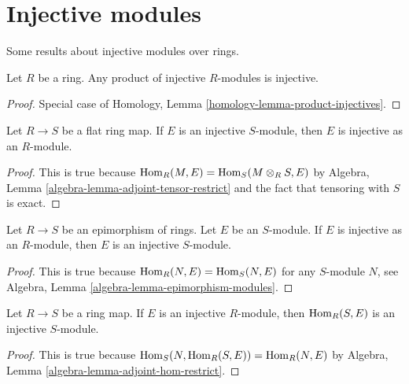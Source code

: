 \section{Injective modules}
\label{section-injective-modules}

\noindent
Some results about injective modules over rings.

\begin{lemma}
\label{lemma-product-injectives}
Let $R$ be a ring. Any product of injective $R$-modules is injective.
\end{lemma}

\begin{proof}
Special case of Homology, Lemma \ref{homology-lemma-product-injectives}.
\end{proof}

\begin{lemma}
\label{lemma-injective-flat}
Let $R \to S$ be a flat ring map. If $E$ is an injective $S$-module,
then $E$ is injective as an $R$-module.
\end{lemma}

\begin{proof}
This is true because $\mathop{\mathrm{Hom}}\nolimits_R(M, E) = \mathop{\mathrm{Hom}}\nolimits_S(M \otimes_R S, E)$
by Algebra, Lemma \ref{algebra-lemma-adjoint-tensor-restrict}
and the fact that tensoring with $S$ is exact.
\end{proof}

\begin{lemma}
\label{lemma-injective-epimorphism}
Let $R \to S$ be an epimorphism of rings. Let $E$ be an $S$-module.
If $E$ is injective as an $R$-module, then $E$ is an injective $S$-module.
\end{lemma}

\begin{proof}
This is true because $\mathop{\mathrm{Hom}}\nolimits_R(N, E) = \mathop{\mathrm{Hom}}\nolimits_S(N, E)$ for any $S$-module $N$,
see Algebra, Lemma \ref{algebra-lemma-epimorphism-modules}.
\end{proof}

\begin{lemma}
\label{lemma-hom-injective}
Let $R \to S$ be a ring map. If $E$ is an injective $R$-module,
then $\mathop{\mathrm{Hom}}\nolimits_R(S, E)$ is an injective $S$-module.
\end{lemma}

\begin{proof}
This is true because $\mathop{\mathrm{Hom}}\nolimits_S(N, \mathop{\mathrm{Hom}}\nolimits_R(S, E)) = \mathop{\mathrm{Hom}}\nolimits_R(N, E)$ by
Algebra, Lemma \ref{algebra-lemma-adjoint-hom-restrict}.
\end{proof}

